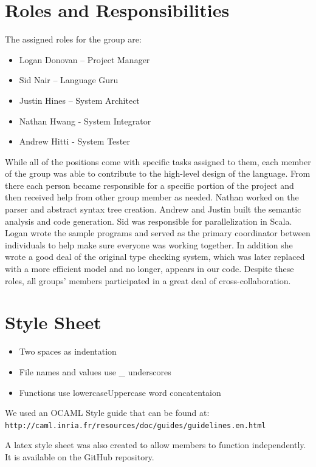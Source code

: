 \section{Roles and Responsibilities}
The assigned roles for the group are:
\begin{itemize}
\item Logan Donovan – Project Manager
\item Sid Nair – Language Guru
\item Justin Hines – System Architect
\item Nathan Hwang - System Integrator
\item Andrew Hitti	- System Tester
\end{itemize}

While all of the positions come with specific tasks assigned to them,
each member of the group was able to contribute to the high-level
design of the language.  From there each person became responsible for
a specific portion of the project and then received help from other
group member as needed. Nathan worked on the parser and abstract
syntax tree creation. Andrew and Justin built the semantic analysis
and code generation. Sid was responsible for parallelization in
Scala. Logan wrote the sample programs and served as the primary
coordinator between individuals to help make sure everyone was working
together. In addition she wrote a good deal of the original type
checking system, which was later replaced with a more efficient model
and no longer, appears in our code. Despite these roles, all groups'
members participated in a great deal of cross-collaboration.

\section{Style Sheet}
\begin{itemize}
\item Two spaces as indentation 
\item File names and values use \_ underscores
\item Functions use lowercaseUppercase word concatentaion 
\end{itemize}

We used an OCAML Style guide that can be found at:
\\ \verb=http://caml.inria.fr/resources/doc/guides/guidelines.en.html=

A latex style sheet was also created to allow members to function
independently. It is available on the GitHub repository.
